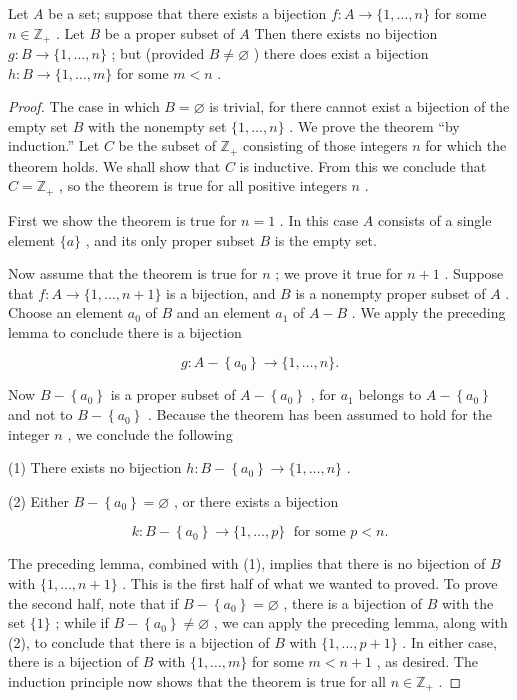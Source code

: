 \begin{theorem} Let \(A\) be a set; suppose that there exists a bijection \(f : A \rightarrow  \{ 1,\ldots ,n\}\) for some \(n \in  {\mathbb{Z}}_{ + }\) . Let \(B\) be a proper subset of \(A\) Then there exists no bijection \(g : B \rightarrow  \{ 1,\ldots ,n\}\) ; but (provided \(B \neq  \varnothing\) ) there does exist a bijection \(h : B \rightarrow  \{ 1,\ldots ,m\}\) for some \(m < n\) .
\end{theorem}

\begin{proof}The case in which \(B = \varnothing\) is trivial, for there cannot exist a bijection of the empty set \(B\) with the nonempty set \(\{ 1,\ldots ,n\}\) .
We prove the theorem ``by induction.'' Let \(C\) be the subset of \({\mathbb{Z}}_{ + }\) consisting of those integers \(n\) for which the theorem holds. We shall show that \(C\) is inductive. From this we conclude that \(C = {\mathbb{Z}}_{ + }\) , so the theorem is true for all positive integers \(n\) .

First we show the theorem is true for \(n = 1\) . In this case \(A\) consists of a single element \(\{ a\}\) , and its only proper subset \(B\) is the empty set.

Now assume that the theorem is true for \(n\) ; we prove it true for \(n + 1\) . Suppose that \(f : A \rightarrow  \{ 1,\ldots ,n + 1\}\) is a bijection, and \(B\) is a nonempty proper subset of \(A\) . Choose an element \({a}_{0}\) of \(B\) and an element \({a}_{1}\) of \(A - B\) . We apply the preceding lemma to conclude there is a bijection

\[
g : A - \left\{  {a}_{0}\right\} \rightarrow  \{ 1,\ldots ,n\} .
\]

Now \(B - \left\{  {a}_{0}\right\}\) is a proper subset of \(A - \left\{  {a}_{0}\right\}\) , for \({a}_{1}\) belongs to \(A - \left\{  {a}_{0}\right\}\) and not to \(B - \left\{  {a}_{0}\right\}\) . Because the theorem has been assumed to hold for the integer \(n\) , we conclude the following

(1) There exists no bijection \(h : B - \left\{  {a}_{0}\right\} \rightarrow  \{ 1,\ldots ,n\}\) .

(2) Either \(B - \left\{  {a}_{0}\right\} = \varnothing\) , or there exists a bijection

\[
k : B - \left\{  {a}_{0}\right\} \rightarrow  \{ 1,\ldots ,p\} \;\text{ for some }p < n.
\]

The preceding lemma, combined with (1), implies that there is no bijection of \(B\) with \(\{ 1,\ldots ,n + 1\}\) . This is the first half of what we wanted to proved. To prove the second half, note that if \(B - \left\{  {a}_{0}\right\} = \varnothing\) , there is a bijection of \(B\) with the set \(\{ 1\}\) ; while if \(B - \left\{  {a}_{0}\right\} \neq  \varnothing\) , we can apply the preceding lemma, along with (2), to conclude that there is a bijection of \(B\) with \(\{ 1,\ldots ,p + 1\}\) . In either case, there is a bijection of \(B\) with \(\{ 1,\ldots ,m\}\) for some \(m < n + 1\) , as desired. The induction principle now shows that the theorem is true for all \(n \in  {\mathbb{Z}}_{ + }\) .
\end{proof}
